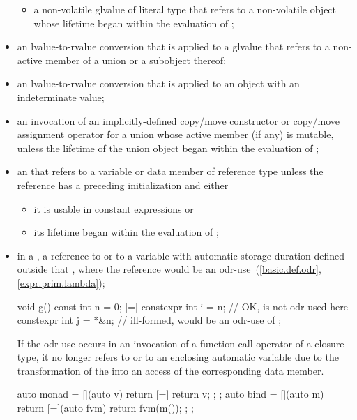 \begin{itemize}
\begin{itemize}
  \item
  a non-volatile glvalue of literal type that refers to a non-volatile object
  whose lifetime began within the evaluation of ;
\end{itemize}

\item
an lvalue-to-rvalue conversion
that is applied to a glvalue
that refers to a non-active member of a union or a subobject thereof;

\item
an lvalue-to-rvalue conversion that is applied to
an object with an indeterminate value;

\item
an invocation of an implicitly-defined copy/move constructor or
copy/move assignment operator
for a union whose active member (if any) is mutable,
unless the lifetime of the union object began within the evaluation of ;

\item
an  that refers to a variable or
data member of reference type
unless the reference has a preceding initialization and either
\begin{itemize}
  \item
  it is usable in constant expressions or

  \item
  its lifetime began within the evaluation of ;
\end{itemize}

\item
in a ,
a reference to  or to a variable with
automatic storage duration defined outside that
, where
the reference would be an odr-use~(\ref{basic.def.odr}, \ref{expr.prim.lambda});
\begin{example}
\begin{codeblock}
void g() {
  const int n = 0;
  [=] {
    constexpr int i = n;        // OK,  is not odr-used here
    constexpr int j = *&n;      // ill-formed,  would be an odr-use of 
  };
}
\end{codeblock}
\end{example}
\begin{note}
If the odr-use occurs in an invocation
of a function call operator of a closure type,
it no longer refers to  or to an enclosing automatic variable
due to the transformation
of the  into
an access of the corresponding data member.
\begin{example}
\begin{codeblock}
auto monad = [](auto v) { return [=] { return v; }; };
auto bind = [](auto m) {
  return [=](auto fvm) { return fvm(m()); };
};


\end{codeblock}
\end{example}
\end{note}
\end{itemize}
